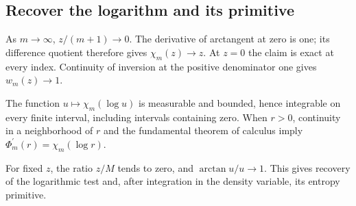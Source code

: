 \documentclass[11pt,a4paper]{report}
\begin{document}
\subsection{\texorpdfstring{Recover the logarithm and its primitive}{Recover the logarithm and its primitive}}
\label{report-step-UnadjustedLangevin-LSI-BoundedLog-lean-3}


As \(m\to\infty\), \(z/(m+1)\to0\). The derivative of arctangent at zero is one; its difference quotient therefore gives \(\chi_m(z)\to z\). At \(z=0\) the claim is exact at every index. Continuity of inversion at the positive denominator one gives \(w_m(z)\to1\).



The function \(u\mapsto\chi_m(\log u)\) is measurable and bounded, hence integrable on every finite interval, including intervals containing zero. When \(r>0\), continuity in a neighborhood of \(r\) and the fundamental theorem of calculus imply \(\Phi_m^{\prime}(r)=\chi_m(\log r)\).



For fixed \(z\), the ratio \(z/M\) tends to zero, and \(\arctan u/u\to1\). This gives recovery of the logarithmic test and, after integration in the density variable, its entropy primitive.
\end{document}
